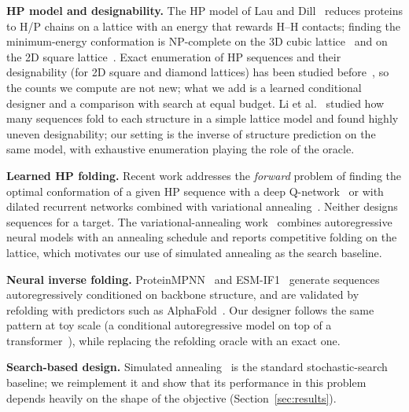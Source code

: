 \textbf{HP model and designability.} The HP model of Lau and Dill~\cite{lau1989lattice} reduces proteins to H/P chains on a lattice with an energy that rewards H--H contacts; finding the minimum-energy conformation is NP-complete on the 3D cubic lattice~\cite{berger1998protein} and on the 2D square lattice~\cite{crescenzi1998complexity}. Exact enumeration of HP sequences and their designability (for 2D square and diamond lattices) has been studied before~\cite{narasimhan2012hp}, so the counts we compute are not new; what we add is a learned conditional designer and a comparison with search at equal budget. Li et al.~\cite{li1996emergence} studied how many sequences fold to each structure in a simple lattice model and found highly uneven designability; our setting is the inverse of structure prediction on the same model, with exhaustive enumeration playing the role of the oracle.

\textbf{Learned HP folding.} Recent work addresses the \emph{forward} problem of finding the optimal conformation of a given HP sequence with a deep Q-network~\cite{yang2022applying} or with dilated recurrent networks combined with variational annealing~\cite{khandoker2025lattice}. Neither designs sequences for a target. The variational-annealing work~\cite{khandoker2025lattice} combines autoregressive neural models with an annealing schedule and reports competitive folding on the lattice, which motivates our use of simulated annealing as the search baseline.

\textbf{Neural inverse folding.} ProteinMPNN~\cite{dauparas2022robust} and ESM-IF1~\cite{hsu2022learning} generate sequences autoregressively conditioned on backbone structure, and are validated by refolding with predictors such as AlphaFold~\cite{jumper2021highly}. Our designer follows the same pattern at toy scale (a conditional autoregressive model on top of a transformer~\cite{vaswani2017attention}), while replacing the refolding oracle with an exact one.

\textbf{Search-based design.} Simulated annealing~\cite{kirkpatrick1983optimization} is the standard stochastic-search baseline; we reimplement it and show that its performance in this problem depends heavily on the shape of the objective (Section~\ref{sec:results}).
